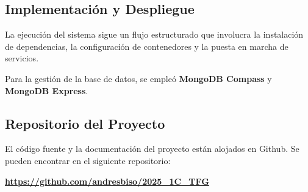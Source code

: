 \subsection{Implementación y Despliegue}
La ejecución del sistema sigue un flujo estructurado que involucra la instalación de dependencias, la configuración de contenedores y la puesta en marcha de servicios. 

Para la gestión de la base de datos, se empleó \textbf{MongoDB Compass} y \textbf{MongoDB Express}.

\subsection{Repositorio del Proyecto}
El código fuente y la documentación del proyecto están alojados en Github.
Se pueden encontrar en el siguiente repositorio:

\begin{center}
	\textbf{\href{https://github.com/andresbiso/2025\_1C\_TFG}{https://github.com/andresbiso/2025\_1C\_TFG}}
\end{center}
